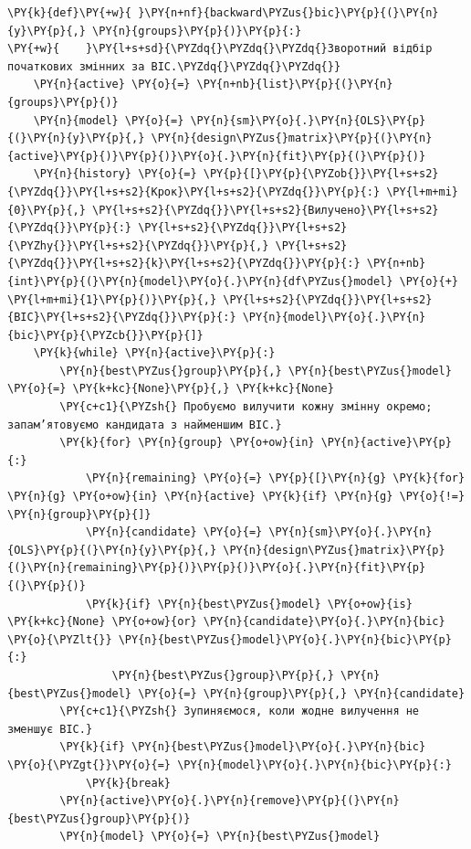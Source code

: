 \begin{Verbatim}[commandchars=\\\{\}]
\PY{k}{def}\PY{+w}{ }\PY{n+nf}{backward\PYZus{}bic}\PY{p}{(}\PY{n}{y}\PY{p}{,} \PY{n}{groups}\PY{p}{)}\PY{p}{:}
\PY{+w}{    }\PY{l+s+sd}{\PYZdq{}\PYZdq{}\PYZdq{}Зворотний відбір початкових змінних за BIC.\PYZdq{}\PYZdq{}\PYZdq{}}
    \PY{n}{active} \PY{o}{=} \PY{n+nb}{list}\PY{p}{(}\PY{n}{groups}\PY{p}{)}
    \PY{n}{model} \PY{o}{=} \PY{n}{sm}\PY{o}{.}\PY{n}{OLS}\PY{p}{(}\PY{n}{y}\PY{p}{,} \PY{n}{design\PYZus{}matrix}\PY{p}{(}\PY{n}{active}\PY{p}{)}\PY{p}{)}\PY{o}{.}\PY{n}{fit}\PY{p}{(}\PY{p}{)}
    \PY{n}{history} \PY{o}{=} \PY{p}{[}\PY{p}{\PYZob{}}\PY{l+s+s2}{\PYZdq{}}\PY{l+s+s2}{Крок}\PY{l+s+s2}{\PYZdq{}}\PY{p}{:} \PY{l+m+mi}{0}\PY{p}{,} \PY{l+s+s2}{\PYZdq{}}\PY{l+s+s2}{Вилучено}\PY{l+s+s2}{\PYZdq{}}\PY{p}{:} \PY{l+s+s2}{\PYZdq{}}\PY{l+s+s2}{\PYZhy{}}\PY{l+s+s2}{\PYZdq{}}\PY{p}{,} \PY{l+s+s2}{\PYZdq{}}\PY{l+s+s2}{k}\PY{l+s+s2}{\PYZdq{}}\PY{p}{:} \PY{n+nb}{int}\PY{p}{(}\PY{n}{model}\PY{o}{.}\PY{n}{df\PYZus{}model} \PY{o}{+} \PY{l+m+mi}{1}\PY{p}{)}\PY{p}{,} \PY{l+s+s2}{\PYZdq{}}\PY{l+s+s2}{BIC}\PY{l+s+s2}{\PYZdq{}}\PY{p}{:} \PY{n}{model}\PY{o}{.}\PY{n}{bic}\PY{p}{\PYZcb{}}\PY{p}{]}
    \PY{k}{while} \PY{n}{active}\PY{p}{:}
        \PY{n}{best\PYZus{}group}\PY{p}{,} \PY{n}{best\PYZus{}model} \PY{o}{=} \PY{k+kc}{None}\PY{p}{,} \PY{k+kc}{None}
        \PY{c+c1}{\PYZsh{} Пробуємо вилучити кожну змінну окремо; запам’ятовуємо кандидата з найменшим BIC.}
        \PY{k}{for} \PY{n}{group} \PY{o+ow}{in} \PY{n}{active}\PY{p}{:}
            \PY{n}{remaining} \PY{o}{=} \PY{p}{[}\PY{n}{g} \PY{k}{for} \PY{n}{g} \PY{o+ow}{in} \PY{n}{active} \PY{k}{if} \PY{n}{g} \PY{o}{!=} \PY{n}{group}\PY{p}{]}
            \PY{n}{candidate} \PY{o}{=} \PY{n}{sm}\PY{o}{.}\PY{n}{OLS}\PY{p}{(}\PY{n}{y}\PY{p}{,} \PY{n}{design\PYZus{}matrix}\PY{p}{(}\PY{n}{remaining}\PY{p}{)}\PY{p}{)}\PY{o}{.}\PY{n}{fit}\PY{p}{(}\PY{p}{)}
            \PY{k}{if} \PY{n}{best\PYZus{}model} \PY{o+ow}{is} \PY{k+kc}{None} \PY{o+ow}{or} \PY{n}{candidate}\PY{o}{.}\PY{n}{bic} \PY{o}{\PYZlt{}} \PY{n}{best\PYZus{}model}\PY{o}{.}\PY{n}{bic}\PY{p}{:}
                \PY{n}{best\PYZus{}group}\PY{p}{,} \PY{n}{best\PYZus{}model} \PY{o}{=} \PY{n}{group}\PY{p}{,} \PY{n}{candidate}
        \PY{c+c1}{\PYZsh{} Зупиняємося, коли жодне вилучення не зменшує BIC.}
        \PY{k}{if} \PY{n}{best\PYZus{}model}\PY{o}{.}\PY{n}{bic} \PY{o}{\PYZgt{}}\PY{o}{=} \PY{n}{model}\PY{o}{.}\PY{n}{bic}\PY{p}{:}
            \PY{k}{break}
        \PY{n}{active}\PY{o}{.}\PY{n}{remove}\PY{p}{(}\PY{n}{best\PYZus{}group}\PY{p}{)}
        \PY{n}{model} \PY{o}{=} \PY{n}{best\PYZus{}model}

\end{Verbatim}
